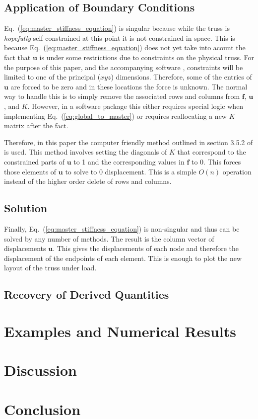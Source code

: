 \documentclass{article}
\begin{document}
\subsection{Application of Boundary Conditions}

Eq.~(\ref{eq:master_stiffness_equation}) is singular because while the truss
is \emph{hopefully} self constrained at this point it is not constrained in
space.  This is because Eq.~(\ref{eq:master_stiffness_equation}) does not yet
take into acount the fact that $\mathbf{u}$ is under some restrictions due to
constraints on the physical truss.  For the purpose of this paper, and the
accompanying software \parencite{shannon2016}, constraints will be limited to
one of the principal ($xyz$) dimensions.  Therefore, some of the entries of
$\mathbf{u}$ are forced to be zero and in these locations the force is
unknown.  The normal way to handle this is to simply remove the associated
rows and columns from $\mathbf{f}$, $\mathbf{u}$, and $K$.  However, in a
software package this either requires special logic when implementing
Eq.~(\ref{eq:global_to_master}) or requires reallocating a new $K$ matrix
after the fact.

Therefore, in this paper the computer friendly method outlined in section
3.5.2 of \cite{felippa2004ch3} is used.  This method involves setting the
diagonals of $K$ that correspond to the constrained parts of $\mathbf{u}$ to 1
and the corresponding values in $\mathbf{f}$ to 0.  This forces those elements
of $\mathbf{u}$ to solve to 0 displacement.  This is a simple $O(n)$ operation
instead of the higher order delete of rows and columns.


\subsection{Solution}

Finally, Eq.~(\ref{eq:master_stiffness_equation}) is non-singular and thus can
be solved by any number of methods.  The result is the column vector of
displacements $\mathbf{u}$.  This gives the displacements of each node and
therefore the displacement of the endpoints of each element.  This is enough
to plot the new layout of the truss under load.


\subsection{Recovery of Derived Quantities}





\section{Examples and Numerical Results}


\section{Discussion}


\section{Conclusion}


\printbibliography{}
\end{document}
